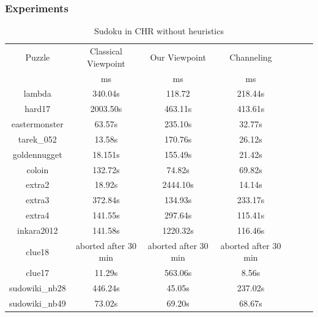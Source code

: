 \documentclass{report}
\begin{document}
\subsubsection{Experiments}
\begin{table}[h!]
  \begin{tabular}{|c|c|c|c|c|c|c|}
    \hline
    \multirow{1}{*}{Puzzle} &
      \multicolumn{1}{L|}{Classical Viewpoint} &
      \multicolumn{1}{L|}{Our Viewpoint} &
      \multicolumn{1}{L|}{Channeling} \\
    & ms & ms & ms \\
    \hline
lambda & 340.04s & 118.72 & 218.44s \\
hard17 & 2003.50s & 463.11s & 413.61s \\
eastermonster & 63.57s & 235.10s & 32.77s \\
tarek\_052 & 13.58s & 170.76s & 26.12s \\
goldennugget & 18.151s & 155.49s & 21.42s \\
coloin & 132.72s & 74.82s & 69.82s \\
extra2 & 18.92s & 2444.10s & 14.14s\\
extra3 & 372.84s & 134.93s & 233.17s \\
extra4 & 141.55s & 297.64s & 115.41s\\
inkara2012 & 141.58s & 1220.32s & 116.46s\\
clue18 & aborted after 30 min & aborted after 30 min & aborted after 30 min \\
clue17 & 11.29s & 563.06s & 8.56s \\
sudowiki\_nb28& 446.24s & 45.05s & 237.02s \\
sudowiki\_nb49 & 73.02s & 69.20s & 68.67s \\
 \hline
  \end{tabular}
  \caption{Sudoku in CHR without heuristics}
\end{table}
\end{document}
